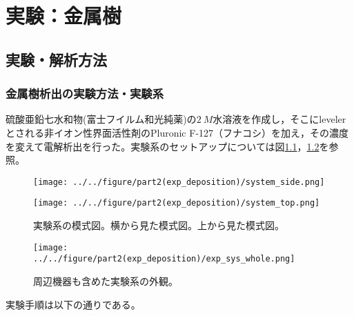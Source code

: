 \documentclass[autodetect-engine,dvi=dvipdfmx,a4paper,ja=standard,oneside,openany,11pt]{bxjsbook}
\begin{document}
\chapter{実験：金属樹}
\section{実験・解析方法}
\subsection{金属樹析出の実験方法・実験系}
硫酸亜鉛七水和物(富士フイルム和光純薬)の$\SI{2}{M}$水溶液を作成し，そこにlevelerとされる非イオン性界面活性剤のPluronic F-127（フナコシ）を加え，その濃度を変えて電解析出を行った。実験系のセットアップについては図\ref{fig:system_exp}，\ref{fig:system_exp_whole}を参照。

\begin{figure}[htbp]
  \begin{minipage}
    {0.55\textwidth}
    \subcaption{}
    \centering
    \texttt{[image: ../../figure/part2(exp\_deposition)/system\_side.png]}
    \label{fig:system_side}
  \end{minipage}
  \begin{minipage}
    {0.43\textwidth}
    \subcaption{}
    \centering
    \texttt{[image: ../../figure/part2(exp\_deposition)/system\_top.png]}
    \label{fig:system_top}
  \end{minipage}
  \caption{実験系の模式図。横から見た模式図。上から見た模式図。}
  \label{fig:system_exp}
\end{figure}

\begin{figure}[htbp]
  \centering
  \texttt{[image: ../../figure/part2(exp\_deposition)/exp\_sys\_whole.png]}
  \caption{周辺機器も含めた実験系の外観。}
  \label{fig:system_exp_whole}
\end{figure}

実験手順は以下の通りである。
\end{document}
